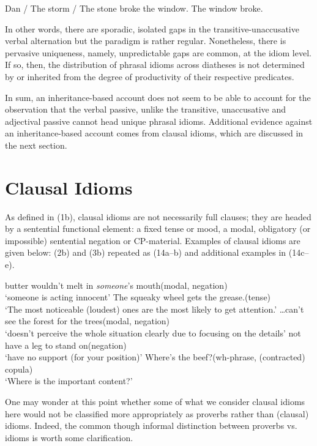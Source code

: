 \documentclass[output=paper,
modfonts
]{LSP/langsci}
\begin{document}
\ea
	\ea Dan / The storm / The stone broke the window.
	\ex The window broke.
	\z
\z

In other words, there are sporadic, isolated gaps in the
transitive-unaccusative verbal alternation but the paradigm is rather
regular. Nonetheless, there is pervasive uniqueness, namely,
unpredictable gaps are common, at the idiom level. If so, then, the
distribution of phrasal idioms across diatheses is not determined by or
inherited from the degree of productivity of their respective
predicates.

In sum, an inheritance-based account does not seem to be able to account
for the observation that the verbal passive, unlike the transitive,
unaccusative and adjectival passive cannot head unique phrasal idioms.
Additional evidence against an inheritance-based account comes from
clausal idioms, which are discussed in the next section.

\section{Clausal Idioms }

As defined in (1b), clausal idioms are not necessarily full clauses;
they are headed by a sentential functional element: a fixed tense or
mood, a modal, obligatory (or impossible) sentential negation or
CP-material. Examples of clausal idioms are given below: (2b) and (3b)
repeated as (14a--b) and additional examples in (14c--e).

\ea
	\ea butter wouldn't melt in \emph{someone}'s mouth\hfill (modal, negation)\\
	`someone is acting innocent'
	\ex The squeaky wheel gets the grease.\hfill (tense)\\
	 `The most noticeable (loudest) ones are the most likely to get attention.'
	\ex \ldots{}can't see the forest for the trees\hfill (modal, negation)\\
	`doesn't perceive the whole situation clearly due to focusing on the
	details'
	\ex not have a leg to stand on\hfill (negation)\\
	`have no support (for your position)'
	\ex Where's the beef?\hfill (wh-phrase, (contracted) copula)\\
	`Where is the important content?'
	\z
\z

One may wonder at this point whether some of what we consider clausal
idioms here would not be classified more appropriately as proverbs
rather than (clausal) idioms. Indeed, the common though informal
distinction between proverbs vs. idioms is worth some clarification.
\end{document}
